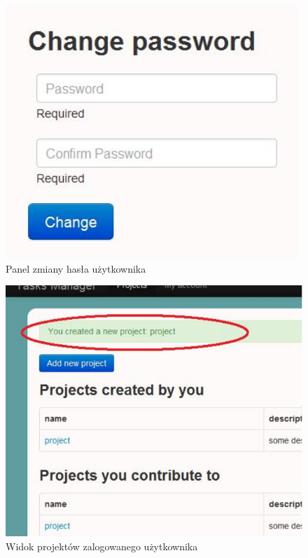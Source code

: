 \documentclass[a4paper,12pt,notitlepage]{mwrep}
\begin{document}
\begin{figure}[H]
\centering
\includegraphics[scale=0.5]{images/app/3.png}
\caption{Panel zmiany hasła użytkownika}
\label{fig:app_passwd}
\end{figure}

\begin{figure}[H]
\centering
\includegraphics[scale=0.6]{images/app/4.png}
\caption{Widok projektów zalogowanego użytkownika}
\label{fig:app_projects}
\end{figure}
\end{document}
